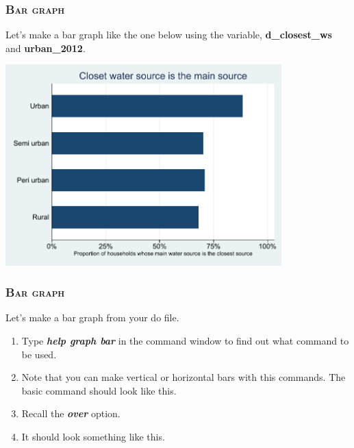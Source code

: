 \documentclass[10pt]{beamer}
\begin{document}
	\begin{frame}
	\frametitle{\textsc{Bar graph}}
		Let's make a bar graph like the one below using the variable, \textbf{d\_closest\_ws} and \textbf{urban\_2012}.
		\vspace{1mm}
	
\begin{center}
    \includegraphics[width=0.8\textwidth]{bar_1.pdf}
\end{center}
	\end{frame}
	
	\begin{frame}
	\frametitle{\textsc{Bar graph}}	
		 Let's make a bar graph from your do file.
		\begin{enumerate}
			 \item Type \textbf{\textit{help graph bar}} in the command window 
				   to find out what command to be used.
			 \onslide<2-> \item Note that you can make vertical or horizontal 
								bars with this commands. The basic command should
								look like this.
		
\begin{stlog}\end{stlog}
			\vspace{1mm}
			 \item Recall the \textbf{\textit{over}} option.
			\vspace{1mm}
			\onslide<4-> \item It should look something like this.
		
\begin{stlog}\end{stlog}
		\end{enumerate}
	\end{frame}
	
\end{document}
